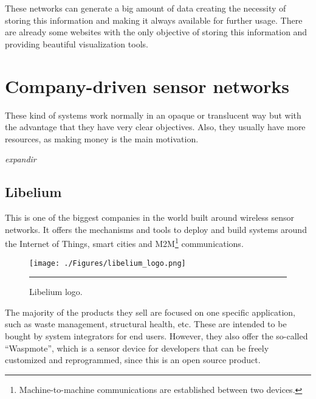 
These networks can generate a big amount of data creating the necessity of storing this information and making it always available for further usage. There are already some websites with the only objective of storing this information and providing beautiful visualization tools.


\section{Company-driven sensor networks}

These kind of systems work normally in an opaque or translucent way but with the advantage that they have very clear objectives. Also, they usually have more resources, as making money is the main motivation.

\emph{expandir}

\subsection{Libelium}

This is one of the biggest companies in the world built around wireless sensor networks. It offers the mechanisms and tools to deploy and build systems around the Internet of Things, smart cities and M2M\footnote{Machine-to-machine communications are established between two devices.} communications.

\begin{figure}[htbp]
    \centering
    \texttt{[image: ./Figures/libelium\_logo.png]}
        \rule{35em}{0.5pt}
        \caption[Libelium logo]{Libelium logo.}
    \label{fig:ArduinoUNO}
\end{figure}

The majority of the products they sell are focused on one specific application, such as waste management, structural health, etc. These are intended to be bought by system integrators for end users. However, they also offer the so-called ``Waspmote'', which is a sensor device for developers that can be freely customized and reprogrammed, since this is an open source product.

